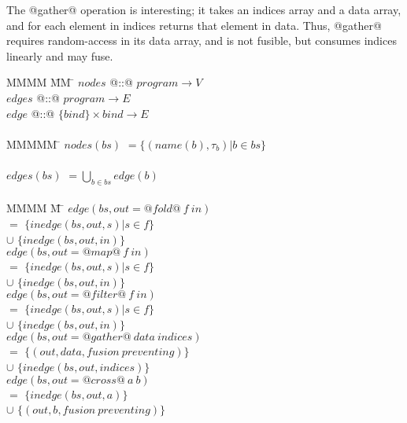 The @gather@ operation is interesting; it takes an indices array and a data array, and for each element in indices returns that element in data.
Thus, @gather@ requires random-access in its data array, and is not fusible, but consumes indices linearly and may fuse.

\begin{tabbing}
MMMM        \= MM   \= \kill
$nodes$     \> @::@ \> $program \to V$          \\
$edges$     \> @::@ \> $program \to E$          \\
$edge$      \> @::@ \> $\{bind\} \times bind \to E$\\
\\
MMMMM       \= \kill
$nodes(bs)$ \> $= \{(name(b), \tau_b) | b \in bs\}$       \\
\\
$edges(bs)$ \> $= \bigcup_{b \in bs}edge(b)$    \\
\\
MMMM             \= M \= \kill
$edge(bs, out = @fold@~f~in)$ \\
                              \> $=$    \> $\{inedge(bs,out,s) | s \in f\}$ \\
                              \> $\cup$ \> $\{inedge(bs, out, in) \}$       \\
$edge(bs, out = @map@~f~in)$  \\
                              \> $=$    \> $\{inedge(bs,out,s) | s \in f\}$ \\
                              \> $\cup$ \> $\{inedge(bs, out, in) \}$       \\
$edge(bs, out = @filter@~f~in)$  \\
                              \> $=$    \> $\{inedge(bs,out,s) | s \in f\}$ \\
                              \> $\cup$ \> $\{inedge(bs, out, in) \}$       \\
$edge(bs, out = @gather@~data~indices)$  \\
                              \> $=$    \> $\{(out,data, fusion~preventing) \}$ \\
                              \> $\cup$ \> $\{inedge(bs, out, indices) \}$       \\
$edge(bs, out = @cross@~a~b)$            \\
                              \> $=$    \> $\{inedge(bs, out, a) \}$       \\
                              \> $\cup$ \> $\{(out, b, fusion~preventing) \}$ \\

\end{tabbing}
